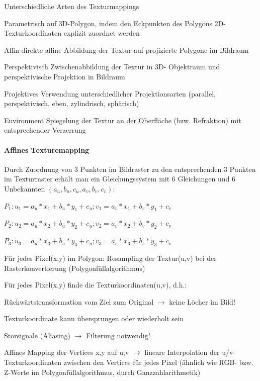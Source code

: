 \documentclass[landscape]{article}
\begin{document}
\begin{multicols}{3}
  Unterschiedliche Arten des Texturmappings
  \begin{description*}
    \item[Parametrisch] auf 3D-Polygon, indem den Eckpunkten des Polygons 2D-Texturkoordinaten explizit zuordnet werden
    \item[Affin] direkte affine Abbildung der Textur auf projizierte Polygone im Bildraum
    \item[Perspektivisch] Zwischenabbildung der Textur in 3D- Objektraum und perspektivische Projektion in Bildraum
    \item[Projektives] Verwendung unterschiedlicher Projektionsarten (parallel, perspektivisch, eben, zylindrisch, sphärisch)
    \item[Environment] Spiegelung der Textur an der Oberfläche (bzw. Refraktion) mit entsprechender Verzerrung
  \end{description*}
  
  \paragraph{Affines Texturemapping}
  Durch Zuordnung von 3 Punkten im Bildraster zu den entsprechenden 3 Punkten im Texturraster erhält man ein Gleichungssystem mit 6 Gleichungen und 6 Unbekannten $(a_u , b_u , c_u , a_v , b_v , c_v )$:
  \begin{itemize*}
    \item $P_1: u_1=a_u*x_1+b_u*y_1+c_u; v_1=a_v*x_1+b_v*y_1+c_v$
    \item $P_2: u_2=a_u*x_2+b_u*y_2+c_u; v_2=a_v*x_2+b_v*y_2+c_v$
    \item $P_3: u_3=a_u*x_3+b_u*y_3+c_u; v_3=a_v*x_3+b_v*y_3+c_v$
  \end{itemize*}
  
  Für jedes Pixel(x,y) im Polygon: Resampling der Textur(u,v) bei der Rasterkonvertierung (Polygonfüllalgorithmus)
  
  Für jedes Pixel(x,y) finde die Texturkoordinaten(u,v), d.h.:
  \begin{itemize*}
    \item Rückwärtstransformation vom Ziel zum Original $\rightarrow$ keine Löcher im Bild!
    \item Texturkoordinate kann übersprungen oder wiederholt sein
    \item Störsignale (Aliasing) $\rightarrow$ Filterung notwendig!
  \end{itemize*}
  
  Affines Mapping der Vertices x,y auf u,v $\rightarrow$ lineare Interpolation der u/v-Texturkoordinaten zwischen den Vertices für jedes Pixel (ähnlich wie RGB- bzw. Z-Werte im Polygonfüllalgorithmus, durch Ganzzahlarithmetik)
  

\end{multicols}
\end{document}
